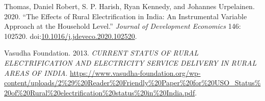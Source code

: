 \documentclass[
]{article}
\newlength{\cslhangindent}
\newlength{\cslentryspacingunit} %
\newenvironment{CSLReferences}[2] %
 {%
  \setlength{\parindent}{0pt}
  \ifodd #1
  \let\oldpar\par
  \def\par{\hangindent=\cslhangindent\oldpar}
  \fi
  \setlength{\parskip}{#2\cslentryspacingunit}
 }%
 {}
\begin{document}
\begin{CSLReferences}{1}{0}
\leavevmode{}%
Thomas, Daniel Robert, S. P. Harish, Ryan Kennedy, and Johannes
Urpelainen. 2020. {``The Effects of Rural Electrification in India: An
Instrumental Variable Approach at the Household Level.''} \emph{Journal
of Development Economics} 146: 102520.
doi:\href{https://doi.org/10.1016/j.jdeveco.2020.102520}{10.1016/j.jdeveco.2020.102520}.

\leavevmode{}%
Vasudha Foundation. 2013. \emph{CURRENT STATUS OF RURAL ELECTRIFICATION
AND ELECTRICITY SERVICE DELIVERY IN RURAL AREAS OF INDIA}.
\url{https://www.vasudha-foundation.org/wp-content/uploads/2\%29\%20Reader\%20Friendly\%20Paper\%20for\%20USO_Status\%20of\%20Rural\%20electrification\%20status\%20in\%20India.pdf}.

\end{CSLReferences}
\end{document}

